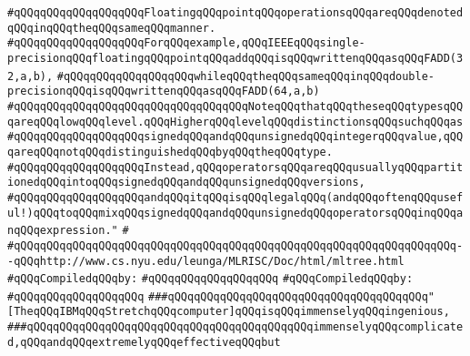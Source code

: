 \verb|#qQQqqQQqqQQqqQQqqQQqFloatingqQQqpointqQQqoperationsqQQqareqQQqdenotedqQQqinqQQqtheqQQqsameqQQqmanner.|\newline
\verb|#qQQqqQQqqQQqqQQqqQQqForqQQqexample,qQQqIEEEqQQqsingle-precisionqQQqfloatingqQQqpointqQQqaddqQQqisqQQqwrittenqQQqasqQQqFADD(32,a,b),|\newline
\verb|#qQQqqQQqqQQqqQQqqQQqwhileqQQqtheqQQqsameqQQqinqQQqdouble-precisionqQQqisqQQqwrittenqQQqasqQQqFADD(64,a,b)|\newline
\verb|#qQQqqQQqqQQqqQQqqQQqqQQqqQQqqQQqqQQqNoteqQQqthatqQQqtheseqQQqtypesqQQqareqQQqlowqQQqlevel.qQQqHigherqQQqlevelqQQqdistinctionsqQQqsuchqQQqas|\newline
\verb|#qQQqqQQqqQQqqQQqqQQqsignedqQQqandqQQqunsignedqQQqintegerqQQqvalue,qQQqareqQQqnotqQQqdistinguishedqQQqbyqQQqtheqQQqtype.|\newline
\verb|#qQQqqQQqqQQqqQQqqQQqInstead,qQQqoperatorsqQQqareqQQqusuallyqQQqpartitionedqQQqintoqQQqsignedqQQqandqQQqunsignedqQQqversions,|\newline
\verb|#qQQqqQQqqQQqqQQqqQQqandqQQqitqQQqisqQQqlegalqQQq(andqQQqoftenqQQquseful!)qQQqtoqQQqmixqQQqsignedqQQqandqQQqunsignedqQQqoperatorsqQQqinqQQqanqQQqexpression."|\newline
\verb|#|\newline
\verb|#qQQqqQQqqQQqqQQqqQQqqQQqqQQqqQQqqQQqqQQqqQQqqQQqqQQqqQQqqQQqqQQqqQQq--qQQqhttp://www.cs.nyu.edu/leunga/MLRISC/Doc/html/mltree.html|\newline
\newline
\verb|#qQQqCompiledqQQqby:|\newline
\verb|#qQQqqQQqqQQqqQQqqQQq|\newline
\newline
\newline
\newline
\verb|#qQQqCompiledqQQqby:|\newline
\verb|#qQQqqQQqqQQqqQQqqQQq|\newline
\newline
\newline
\newline
\verb|###qQQqqQQqqQQqqQQqqQQqqQQqqQQqqQQqqQQqqQQq"[TheqQQqIBMqQQqStretchqQQqcomputer]qQQqisqQQqimmenselyqQQqingenious,|\newline
\verb|###qQQqqQQqqQQqqQQqqQQqqQQqqQQqqQQqqQQqqQQqqQQqimmenselyqQQqcomplicated,qQQqandqQQqextremelyqQQqeffectiveqQQqbut|\newline
